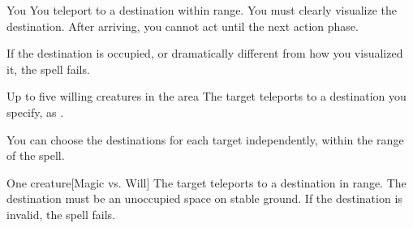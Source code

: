 \begin{spellheader}
    \spellrng{\rngext \rngunrestricted}
\end{spellheader}
\begin{spelleffects}
    \begin{spelltarget}{You}
        \spelleffect You teleport to a destination within range. You must clearly visualize the destination. After arriving, you cannot act until the next action phase.

        If the destination is occupied, or dramatically different from how you visualized it, the spell fails.
    \end{spelltarget}
\end{spelleffects}
\begin{spellfooter}
    
\end{spellfooter}

\begin{spellheader}
\end{spellheader}
\begin{spelleffects}
    \begin{spelltarget}{Up to five willing creatures in the area}
        \spelleffect The target teleports to a destination you specify, as .
    \end{spelltarget}
\end{spelleffects}
\begin{spellfooter}
    \spellnotes You can choose the destinations for each target independently, within the range of the spell. 
\end{spellfooter}

\begin{spellheader}
    \spellrng{\rngmed}
\end{spellheader}
\begin{spelleffects}
    \begin{spelltarget}{One creature}[Magic vs. Will]
        \spelleffect The target teleports to a destination in range. The destination must be an unoccupied space on stable ground. If the destination is invalid, the spell fails.
    \end{spelltarget}
\end{spelleffects}
\begin{spellfooter}
    
\end{spellfooter}

